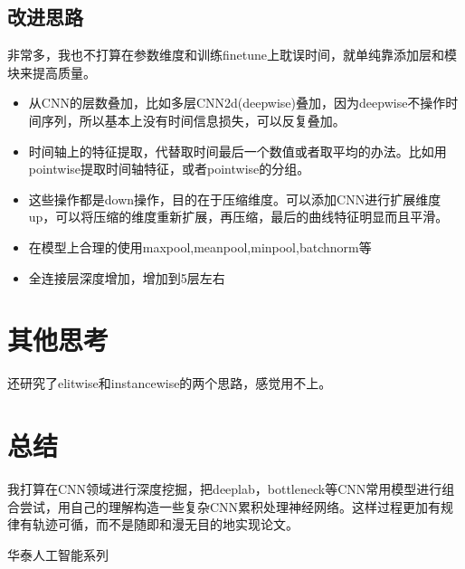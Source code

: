 \documentclass[11pt]{ctexart}
\begin{document}
\subsection{改进思路}
非常多，我也不打算在参数维度和训练finetune上耽误时间，就单纯靠添加层和模块来提高质量。
\begin{itemize}
  \item [1)]
  从CNN的层数叠加，比如多层CNN2d(deepwise)叠加，因为deepwise不操作时间序列，所以基本上没有时间信息损失，可以反复叠加。
  \item [2)]
  时间轴上的特征提取，代替取时间最后一个数值或者取平均的办法。比如用pointwise提取时间轴特征，或者pointwise的分组。
  \item [3)]
  这些操作都是down操作，目的在于压缩维度。可以添加CNN进行扩展维度up，可以将压缩的维度重新扩展，再压缩，最后的曲线特征明显而且平滑。
  \item [4)]
  在模型上合理的使用maxpool,meanpool,minpool,batchnorm等
  \item [5)]
  全连接层深度增加，增加到5层左右

\end{itemize}

\section{其他思考}
还研究了elitwise和instancewise的两个思路，感觉用不上。

\section{总结}
我打算在CNN领域进行深度挖掘，把deeplab，bottleneck等CNN常用模型进行组合尝试，用自己的理解构造一些复杂CNN累积处理神经网络。这样过程更加有规律有轨迹可循，而不是随即和漫无目的地实现论文。

\begin{thebibliography}{1}
 华泰人工智能系列
\end{thebibliography}
\end{document}
